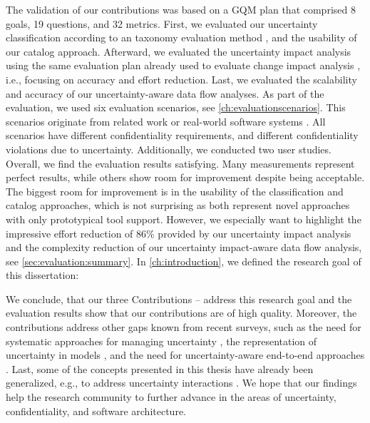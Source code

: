 

The validation of our contributions was based on a \acf{GQM} plan \cite{basili_goal_1994,basili_methodology_1984} that comprised 8 goals, 19 questions, and 32 metrics.
First, we evaluated our uncertainty classification according to an taxonomy evaluation method \cite{kaplan_introducing_2022}, and the usability of our catalog approach.
Afterward, we evaluated the uncertainty impact analysis using the same evaluation plan already used to evaluate change impact analysis \cite{rostami_architecture-based_2015,rostami_architecture-based_2017}, i.e., focusing on accuracy and effort reduction.
Last, we evaluated the scalability and accuracy of our uncertainty-aware data flow analyses.
As part of the evaluation, we used six evaluation scenarios, see \autoref{ch:evaluationscenarios}.
This scenarios originate from related work \cite{katkalov_model-driven_2013,katkalov_modellgetriebener_2017,seifermann_data-driven_2019,rausch_common_2008,leinweber_leveraging_2023} or real-world software systems \cite{robert_koch_institute_open-source_2020,enaya_case_2024,prechelt_finding_2002,saglam_obfuscation-resilient_2024}.
All scenarios have different confidentiality requirements, and different confidentiality violations due to uncertainty.
Additionally, we conducted two user studies.
Overall, we find the evaluation results satisfying.
Many measurements represent perfect results, while others show room for improvement despite being acceptable.
The biggest room for improvement is in the usability of the classification and catalog approaches, which is not surprising as both represent novel approaches with only prototypical tool support.
However, we especially want to highlight the impressive effort reduction of 86\% provided by our uncertainty impact analysis and the complexity reduction of our uncertainty impact-aware data flow analysis, see \autoref{sec:evaluation:summary}.
In \autoref{ch:introduction}, we defined the research goal of this dissertation:

\ResearchGoal

We conclude, that our three Contributions  --  address this research goal and the evaluation results show that our contributions are of high quality.
Moreover, the contributions address other gaps known from recent surveys, such as the need for systematic approaches for managing uncertainty \cite{hezavehi_uncertainty_2021}, the representation of uncertainty in models \cite{troya_uncertainty_2021}, and the need for uncertainty-aware end-to-end approaches \cite{weyns_towards_2023}.
Last, some of the concepts presented in this thesis have already been generalized, e.g., to address uncertainty interactions \cite{camara_uncertainty_2024}.
We hope that our findings help the research community to further advance in the areas of uncertainty, confidentiality, and software architecture.






